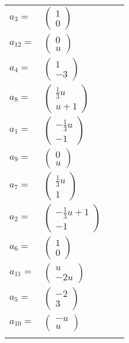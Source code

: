 \documentclass[1p]{elsarticle_modified}
\theoremstyle{definition}
\begin{document}
\begin{tabular}{m{7pt} m{180pt} m{7pt} m{180pt} }
\flushright $a_{3}=$&$\begin{pmatrix}1\\0\end{pmatrix}$ \\
\flushright $a_{12}=$&$\begin{pmatrix}0\\u\end{pmatrix}$ \\
\flushright $a_{4}=$&$\begin{pmatrix}1\\-3\end{pmatrix}$ \\
\flushright $a_{8}=$&$\begin{pmatrix}\frac{1}{3} u\\u+1\end{pmatrix}$ \\
\flushright $a_{1}=$&$\begin{pmatrix}-\frac{1}{3} u\\-1\end{pmatrix}$ \\
\flushright $a_{9}=$&$\begin{pmatrix}0\\u\end{pmatrix}$ \\
\flushright $a_{7}=$&$\begin{pmatrix}\frac{1}{3} u\\1\end{pmatrix}$ \\
\flushright $a_{2}=$&$\begin{pmatrix}-\frac{1}{3} u+1\\-1\end{pmatrix}$ \\
\flushright $a_{6}=$&$\begin{pmatrix}1\\0\end{pmatrix}$ \\
\flushright $a_{11}=$&$\begin{pmatrix}u\\-2 u\end{pmatrix}$ \\
\flushright $a_{5}=$&$\begin{pmatrix}-2\\3\end{pmatrix}$ \\
\flushright $a_{10}=$&$\begin{pmatrix}- u\\u\end{pmatrix}$\\&\end{tabular}
\end{document}
